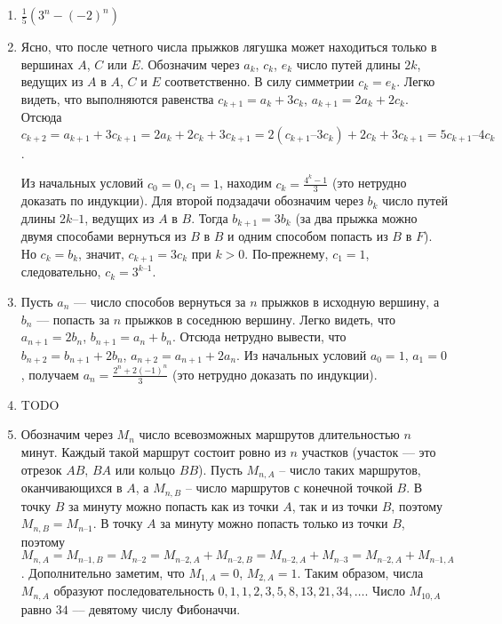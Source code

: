 \documentclass[14pt,openany]{book}
\begin{document}
\begin{enumerate}
\item $\frac{1}{5}(3^n-(-2)^n)$

\item Ясно, что после четного числа прыжков лягушка может находиться только в вершинах $A$, $C$ или $E$. Обозначим через $a_k$, $c_k$, $e_k$ число путей длины $2k$, ведущих из $A$ в $A$, $C$ и $E$ соответственно. В силу симметрии  $c_k = e_k$.  Легко видеть, что выполняются равенства
      $c_{k+1} = a_k + 3c_k$, $a_{k+1} = 2a_k + 2c_k$.
   Отсюда
      $c_{k+2} = a_{k+1} + 3c_{k+1} = 2a_k + 2c_k + 3c_{k+1} = 2(c_{k+1} – 3c_k) + 2c_k + 3c_{k+1} = 5c_{k+1} – 4c_k$.

   Из начальных условий $c_0 = 0,  c_1 = 1$,   находим $c_k = \frac{4^k - 1}{3}$ (это нетрудно доказать по индукции).
   Для второй подзадачи обозначим через $b_k$ число путей длины  $2k – 1$,  ведущих из $A$ в $B$. Тогда   $b_{k+1} = 3b_k$  (за два прыжка можно двумя способами вернуться из $B$ в $B$ и одним способом попасть из $B$ в $F$). Но $c_k = b_k$,   значит,
$c_{k+1} = 3c_k$  при  $k > 0$.  По-прежнему,  $c_1 = 1$,  следовательно, $c_k = 3^{k–1}$.

\item    Пусть $a_n$ --– число способов вернуться за $n$ прыжков в исходную вершину, а $b_n$ --– попасть за $n$ прыжков в соседнюю вершину.
Легко видеть, что   $a_{n+1} = 2b_n$,  $b_{n+1} = a_n + b_n$.   Отсюда нетрудно вывести, что   $b_{n+2} = b_{n+1} + 2b_n$,  $a_{n+2} = a_{n+1} + 2a_n$.
   Из начальных условий $a_0 = 1$, $a_1 = 0$,   получаем $a_n = \frac{2^n + 2(-1)^n}{3}$ (это нетрудно доказать по индукции).

\item TODO

\item   Обозначим через $M_n$ число всевозможных маршрутов длительностью $n$ минут. Каждый такой маршрут состоит ровно из $n$ участков (участок –-- это отрезок $AB$, $BA$ или кольцо $BB$). Пусть  $M_{n,A}$ – число таких маршрутов, оканчивающихся в $A$, а $M_{n,B}$ – число маршрутов с конечной точкой $B$.
  В точку $B$ за минуту можно попасть как из точки $A$, так и из точки $B$, поэтому  $M_{n,B} = M_{n–1}$.
  В точку $A$ за минуту можно попасть только из точки $B$, поэтому  $M_{n,A} = M_{n–1,B} = M_{n–2} = M_{n–2,A} + M_{n–2,B} = M_{n–2,A} + M_{n–3} = M_{n–2,A} + M_{n–1,A}$. 
  Дополнительно заметим, что  $M_{1,A} = 0$, $M_{2,A} = 1$.  Таким образом, числа $M_{n,A}$ образуют последовательность  $0, 1, 1, 2, 3, 5, 8, 13, 21, 34, \ldots$.
  Число $M_{10,A}$ равно $34$ --– девятому числу Фибоначчи.


\end{enumerate}
\end{document}
